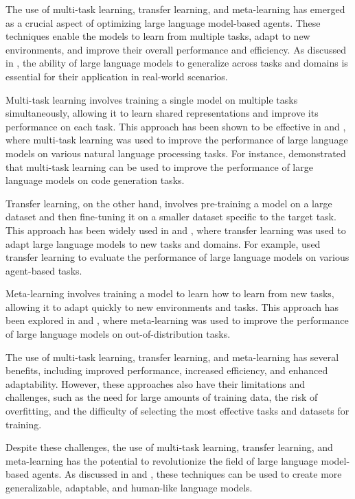 \documentclass[11pt,a4paper]{article}
\begin{document}
The use of multi-task learning, transfer learning, and meta-learning has emerged as a crucial aspect of optimizing large language model-based agents. These techniques enable the models to learn from multiple tasks, adapt to new environments, and improve their overall performance and efficiency. As discussed in \cite{arxiv:2309.14365}, the ability of large language models to generalize across tasks and domains is essential for their application in real-world scenarios.

Multi-task learning involves training a single model on multiple tasks simultaneously, allowing it to learn shared representations and improve its performance on each task. This approach has been shown to be effective in \cite{arxiv:1906.09379} and \cite{doi:10.18653/v1/2021.naacl-main.341}, where multi-task learning was used to improve the performance of large language models on various natural language processing tasks. For instance, \cite{doi:10.18653/v1/2023.acl-long.411} demonstrated that multi-task learning can be used to improve the performance of large language models on code generation tasks.

Transfer learning, on the other hand, involves pre-training a model on a large dataset and then fine-tuning it on a smaller dataset specific to the target task. This approach has been widely used in \cite{arxiv:2304.05332} and \cite{arxiv:2309.02427}, where transfer learning was used to adapt large language models to new tasks and domains. For example, \cite{arxiv:2308.03688} used transfer learning to evaluate the performance of large language models on various agent-based tasks.

Meta-learning involves training a model to learn how to learn from new tasks, allowing it to adapt quickly to new environments and tasks. This approach has been explored in \cite{arxiv:2205.05718} and \cite{arxiv:2301.04589}, where meta-learning was used to improve the performance of large language models on out-of-distribution tasks.

The use of multi-task learning, transfer learning, and meta-learning has several benefits, including improved performance, increased efficiency, and enhanced adaptability. However, these approaches also have their limitations and challenges, such as the need for large amounts of training data, the risk of overfitting, and the difficulty of selecting the most effective tasks and datasets for training.

Despite these challenges, the use of multi-task learning, transfer learning, and meta-learning has the potential to revolutionize the field of large language model-based agents. As discussed in \cite{arxiv:2306.03917} and \cite{arxiv:2406.04692}, these techniques can be used to create more generalizable, adaptable, and human-like language models.
\end{document}
